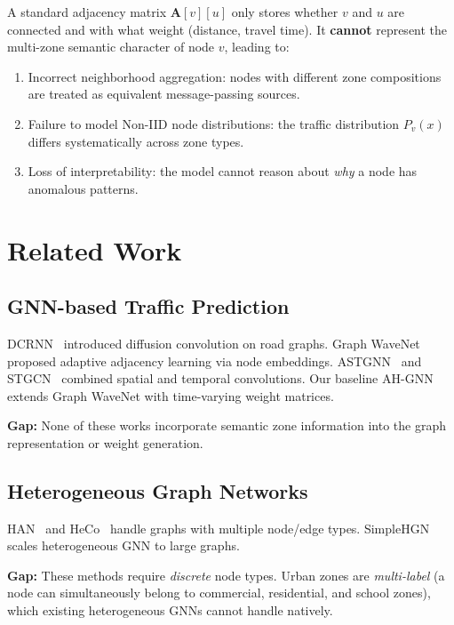 \documentclass[12pt,a4paper]{article}
\begin{document}
A standard adjacency matrix $\mathbf{A}[v][u]$ only stores whether $v$ and $u$
are connected and with what weight (distance, travel time). It \textbf{cannot}
represent the multi-zone semantic character of node $v$, leading to:

\begin{enumerate}
    \item Incorrect neighborhood aggregation: nodes with different zone compositions
          are treated as equivalent message-passing sources.
    \item Failure to model Non-IID node distributions: the traffic distribution
          $P_v(x)$ differs systematically across zone types.
    \item Loss of interpretability: the model cannot reason about \textit{why}
          a node has anomalous patterns.
\end{enumerate}

\section{Related Work}

\subsection{GNN-based Traffic Prediction}
DCRNN~\cite{li2018diffusion} introduced diffusion convolution on road graphs.
Graph WaveNet~\cite{wu2019graph} proposed adaptive adjacency learning via
node embeddings. ASTGNN~\cite{guo2021learning} and STGCN~\cite{yu2018spatio}
combined spatial and temporal convolutions. Our baseline AH-GNN extends
Graph WaveNet with time-varying weight matrices.

\textbf{Gap:} None of these works incorporate semantic zone information into
the graph representation or weight generation.

\subsection{Heterogeneous Graph Networks}
HAN~\cite{wang2019heterogeneous} and HeCo~\cite{wang2021self} handle graphs with
multiple node/edge types. SimpleHGN~\cite{lv2021we} scales heterogeneous GNN to
large graphs.

\textbf{Gap:} These methods require \textit{discrete} node types. Urban zones are
\textit{multi-label} (a node can simultaneously belong to commercial, residential,
and school zones), which existing heterogeneous GNNs cannot handle natively.
\end{document}
